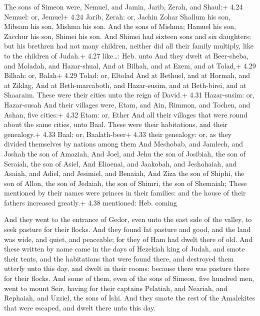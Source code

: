  The sons of Simeon were, Nemuel, and Jamin, Jarib,
Zerah, and Shaul:+ 4.24 Nemuel: or, Jemuel+ 4.24 Jarib, Zerah: or,
Jachin Zohar  Shallum his son, Mibsam his son, Mishma his
son.  And the sons of Mishma; Hamuel his son, Zacchur his
son, Shimei his son.  And Shimei had sixteen sons and six
daughters; but his brethren had not many children, neither did all their
family multiply, like to the children of Judah.+ 4.27 like\ldots: Heb.
unto  And they dwelt at Beer-sheba, and Moladah, and
Hazar-shual,  And at Bilhah, and at Ezem, and at Tolad,+
4.29 Bilhah: or, Balah+ 4.29 Tolad: or, Eltolad  And at
Bethuel, and at Hormah, and at Ziklag,  And at
Beth-marcaboth, and Hazar-susim, and at Beth-birei, and at Shaaraim.
These were their cities unto the reign of David.+ 4.31 Hazar-susim: or,
Hazar-susah  And their villages were, Etam, and Ain,
Rimmon, and Tochen, and Ashan, five cities:+ 4.32 Etam: or, Ether
 And all their villages that were round about the same
cities, unto Baal. These were their habitations, and their genealogy.+
4.33 Baal: or, Baalath-beer+ 4.33 their genealogy: or, as they divided
themselves by nations among them  And Meshobab, and
Jamlech, and Joshah the son of Amaziah,  And Joel, and Jehu
the son of Josibiah, the son of Seraiah, the son of Asiel, 
And Elioenai, and Jaakobah, and Jeshohaiah, and Asaiah, and Adiel, and
Jesimiel, and Benaiah,  And Ziza the son of Shiphi, the son
of Allon, the son of Jedaiah, the son of Shimri, the son of Shemaiah;
 These mentioned by their names were princes in their
families: and the house of their fathers increased greatly.+ 4.38
mentioned: Heb. coming

 And they went to the entrance of Gedor, even unto the
east side of the valley, to seek pasture for their flocks. 
And they found fat pasture and good, and the land was wide, and quiet,
and peaceable; for they of Ham had dwelt there of old.  And
these written by name came in the days of Hezekiah king of Judah, and
smote their tents, and the habitations that were found there, and
destroyed them utterly unto this day, and dwelt in their rooms: because
there was pasture there for their flocks.  And some of
them, even of the sons of Simeon, five hundred men, went to mount Seir,
having for their captains Pelatiah, and Neariah, and Rephaiah, and
Uzziel, the sons of Ishi.  And they smote the rest of the
Amalekites that were escaped, and dwelt there unto this day.

